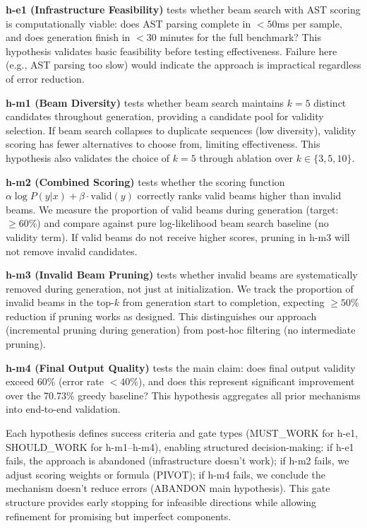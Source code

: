 \textbf{h-e1 (Infrastructure Feasibility)} tests whether beam search with AST scoring is computationally viable: does AST parsing complete in $<50$ms per sample, and does generation finish in $<30$ minutes for the full benchmark? This hypothesis validates basic feasibility before testing effectiveness. Failure here (e.g., AST parsing too slow) would indicate the approach is impractical regardless of error reduction.

\textbf{h-m1 (Beam Diversity)} tests whether beam search maintains $k=5$ distinct candidates throughout generation, providing a candidate pool for validity selection. If beam search collapses to duplicate sequences (low diversity), validity scoring has fewer alternatives to choose from, limiting effectiveness. This hypothesis also validates the choice of $k=5$ through ablation over $k \in \{3, 5, 10\}$.

\textbf{h-m2 (Combined Scoring)} tests whether the scoring function $\alpha \log P(y|x) + \beta \cdot \text{valid}(y)$ correctly ranks valid beams higher than invalid beams. We measure the proportion of valid beams during generation (target: $\geq 60$\%) and compare against pure log-likelihood beam search baseline (no validity term). If valid beams do not receive higher scores, pruning in h-m3 will not remove invalid candidates.

\textbf{h-m3 (Invalid Beam Pruning)} tests whether invalid beams are systematically removed during generation, not just at initialization. We track the proportion of invalid beams in the top-$k$ from generation start to completion, expecting $\geq 50$\% reduction if pruning works as designed. This distinguishes our approach (incremental pruning during generation) from post-hoc filtering (no intermediate pruning).

\textbf{h-m4 (Final Output Quality)} tests the main claim: does final output validity exceed 60\% (error rate $<40$\%), and does this represent significant improvement over the 70.73\% greedy baseline? This hypothesis aggregates all prior mechanisms into end-to-end validation.

Each hypothesis defines success criteria and gate types (MUST\_WORK for h-e1, SHOULD\_WORK for h-m1--h-m4), enabling structured decision-making: if h-e1 fails, the approach is abandoned (infrastructure doesn't work); if h-m2 fails, we adjust scoring weights or formula (PIVOT); if h-m4 fails, we conclude the mechanism doesn't reduce errors (ABANDON main hypothesis). This gate structure provides early stopping for infeasible directions while allowing refinement for promising but imperfect components.

